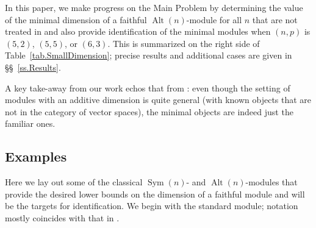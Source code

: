 \documentclass[a4paper, 11pt]{amsart}
\theoremstyle{plain}
\theoremstyle{definition}
\theoremstyle{remark}
\DeclareMathOperator{\Sym}{Sym}
\DeclareMathOperator{\Alt}{Alt}
\begin{document}
In this paper, we make  progress on the Main Problem by determining the value of the minimal dimension of a faithful $\Alt(n)$-module for all $n$ that are not treated in \cite{CDW23} and also provide identification of the minimal modules  when $(n,p)$ is $(5,2)$, $(5,5)$, or $(6,3)$. This is summarized on the right side of Table~\ref{tab.SmallDimension}; precise results and additional cases  are given in \S\S~\ref{ss.Results}.

A key take-away from our work echos that from \cite{CDW23}: even though the setting of modules with an additive dimension is quite general (with known objects that are not in the category of vector spaces), the minimal objects are indeed just the familiar ones.

\subsection{Examples}\label{ss.FamiliarModules}
Here we lay out some of the classical $\Sym(n)$- and $\Alt(n)$-modules that provide the desired lower bounds on the dimension of a faithful module and will be the targets for identification. We begin with the standard module; notation mostly coincides with that in \cite{CDW23}.
\end{document}
